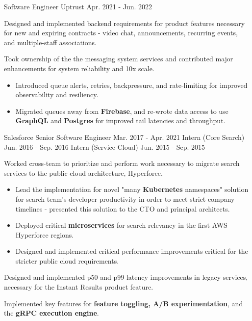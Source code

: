 
\begin{cventries}

  \cventry
    {Software Engineer} %
    {Uptrust} %
    {} %
    {Apr. 2021 - Jun. 2022} %
    {
      \begin{cvitems} %
        \item {Designed and implemented backend requirements for product features necessary for new and expiring contracts - video chat, announcements, recurring events, and multiple-staff associations.}
        \item {Took ownership of the the messaging system services and contributed major enhancements for system reliability and 10x scale.}
        \begin{itemize}
          \item {Introduced queue alerts, retries, backpressure, and rate-limiting for improved observability and resiliency.}
          \item {Migrated queues away from \textbf{Firebase}, and re-wrote data access to use \textbf{GraphQL} and \textbf{Postgres} for improved tail latencies and throughput.}
        \end{itemize}
      \end{cvitems}
    }

  \cvthreeentry
    {Salesforce} %
    {} %
    {Senior Software Engineer}
    {Mar. 2017 - Apr. 2021}
    {Intern (Core Search)}
    {Jun. 2016 - Sep. 2016}
    {Intern (Service Cloud)}
    {Jun. 2015 - Sep. 2015}
    {
      \begin{cvitems} %
      \item {Worked cross-team to prioritize and perform work necessary to migrate search services to the public cloud architecture, Hyperforce.}
        \begin{itemize}
          \item {Lead the implementation for novel "many \textbf{Kubernetes} namespaces" solution for search team's developer productivity in order to meet strict company timelines - presented this solution to the CTO and principal architects.}
          \item {Deployed critical \textbf{microservices} for search relevancy in the first AWS Hyperforce regions.}
          \item {Designed and implemented critical performance improvements critical for the stricter public cloud requirements.}
        \end{itemize}
        \item {Designed and implemented p50 and p99 latency improvements in legacy services, necessary for the Instant Results product feature.}
        \item {Implemented key features for \textbf{feature toggling, A/B experimentation}, and the \textbf{gRPC execution engine}.}
      \end{cvitems}
    }


\end{cventries}
